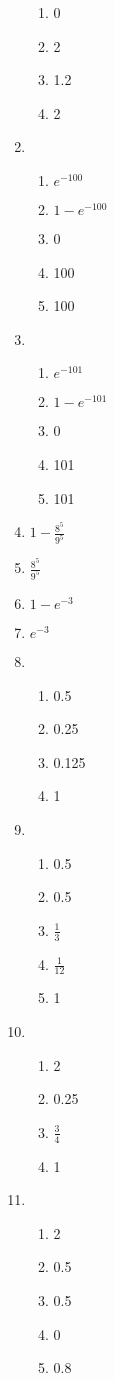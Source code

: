 \begin{enumerate}
\begin{enumerate}
				\item 0
				\item 2
				\item 1.2
				\item 2
			\end{enumerate}
	\item
			\begin{enumerate}
				\item $e^{-100}$
				\item $1 - e^{-100}$
				\item 0
				\item 100
				\item 100
			\end{enumerate}
	\item
			\begin{enumerate}
				\item $e^{-101}$
				\item $1 - e^{-101}$
				\item 0
				\item 101
				\item 101
			\end{enumerate}
	\item $1 - \frac{8^5}{9^5}$
	\item $\frac{8^5}{9^5}$
	\item $1 - e^{-3}$
	\item $e^{-3}$
	\item
			\begin{enumerate}
				\item 0.5
				\item 0.25
				\item 0.125
				\item 1
			\end{enumerate}
	\item
			\begin{enumerate}
				\item 0.5
				\item 0.5
				\item $\frac{1}{3}$
				\item $\frac{1}{12}$
				\item 1
			\end{enumerate}
	\item
			\begin{enumerate}
				\item 2
				\item 0.25
				\item $\frac{3}{4}$
				\item 1
			\end{enumerate}
	\item
			\begin{enumerate}
				\item 2
				\item 0.5
				\item 0.5
				\item 0
				\item 0.8
			\end{enumerate}
\end{enumerate}
